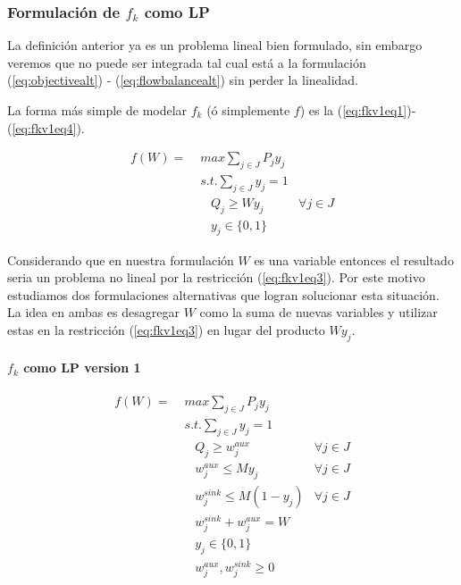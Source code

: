 \documentclass{article}
\begin{document}
  \subsubsection{Formulación de $f_k$ como LP}

  La definición anterior ya es un problema lineal bien formulado, sin embargo veremos que no puede ser integrada tal cual está a la formulación (\ref{eq:objectivealt}) - (\ref{eq:flowbalancealt}) sin perder la linealidad.

  La forma más simple de modelar $f_k$ (ó simplemente $f$) es la (\ref{eq:fkv1eq1})-(\ref{eq:fkv1eq4}).

  \begin{align}
    f(W) =\; & max \sum_{j \in J} P_j y_j    & \label{eq:fkv1eq1}\\
             & s.t. \sum_{j \in J} y_j = 1   & \label{eq:fkv1eq2} \\
             & \;\;\; Q_j \geq W y_j         & \label{eq:fkv1eq3} \forall j \in J \\
             & \;\;\; y_j \in \{0,1\}        & \label{eq:fkv1eq4}
  \end{align}

  Considerando que en nuestra formulación $W$ es una variable entonces el resultado seria un problema no lineal por la restricción (\ref{eq:fkv1eq3}). Por este motivo estudiamos dos formulaciones alternativas que logran solucionar esta situación. La idea en ambas es desagregar $W$ como la suma de nuevas variables y utilizar estas en la restricción (\ref{eq:fkv1eq3}) en lugar del producto $W y_j$.

  \paragraph*{$f_k$ como LP version 1}

  \begin{align}
    f(W) =\; & max \sum_{j \in J} P_j y_j             & \label{eq:fkv3eq1}\\
             & s.t. \sum_{j \in J} y_j = 1            & \label{eq:fkv3eq2}\\
             & \;\;\; Q_j \geq w^{aux}_j              & \forall j \in J \label{eq:fkv3eq3} \\
             & \;\;\; w^{aux}_j \leq M y_j            & \forall j \in J \label{eq:fkv3eq4} \\
             & \;\;\; w^{sink}_j \leq M (1 - y_j)     & \forall j \in J \label{eq:fkv3eq5} \\
             & \;\;\; w^{sink}_j + w^{aux}_j = W      & \label{eq:fkv3eq6} \\
             & \;\;\; y_j \in \{0,1\}                 & \label{eq:fkv3domainy} \\
             & \;\;\; w^{aux}_j, w^{sink}_j \geq 0    & \label{eq:fkv3eq7}
  \end{align}
\end{document}

